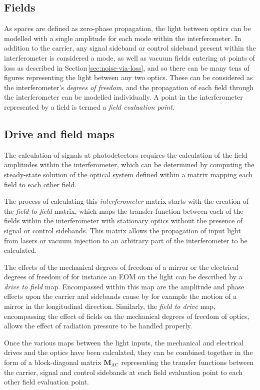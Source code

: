 \subsection{Fields}
As spaces are defined as zero-phase propagation, the light between optics can be modelled with a single amplitude for each mode within the interferometer. In addition to the carrier, any signal sideband or control sideband present within the interferometer is considered a mode, as well as vacuum fields entering at points of loss as described in Section\,\ref{sec:noise-via-loss}, and so there can be many tens of figures representing the light between any two optics. These can be considered as the interferometer's \emph{degrees of freedom}, and the propagation of each field through the interferometer can be modelled individually. A point in the interferometer represented by a field is termed a \emph{field evaluation point}.

\subsection{Drive and field maps}
The calculation of signals at photodetectors requires the calculation of the field amplitudes within the interferometer, which can be determined by computing the steady-state solution of the optical system defined within a matrix mapping each field to each other field.

The process of calculating this \emph{interferometer} matrix starts with the creation of the \emph{field to field} matrix, which maps the transfer function between each of the fields within the interferometer with stationary optics without the presence of signal or control sidebands. This matrix allows the propagation of input light from lasers or vacuum injection to an arbitrary part of the interferometer to be calculated.

The effects of the mechanical degrees of freedom of a mirror or the electrical degrees of freedom of for instance an \gls{EOM} on the light can be described by a \emph{drive to field} map. Encompassed within this map are the amplitude and phase effects upon the carrier and sidebands cause by for example the motion of a mirror in the longitudinal direction. Similarly, the \emph{field to drive} map, encompassing the effect of fields on the mechanical degrees of freedom of optics, allows the effect of radiation pressure to be handled properly.

Once the various maps between the light inputs, the mechanical and electrical drives and the optics have been calculated, they can be combined together in the form of a block-diagonal matrix $\mathbf{M}_{\text{AC}}$ representing the transfer functions between the carrier, signal and control sidebands at each field evaluation point to each other field evaluation point.

